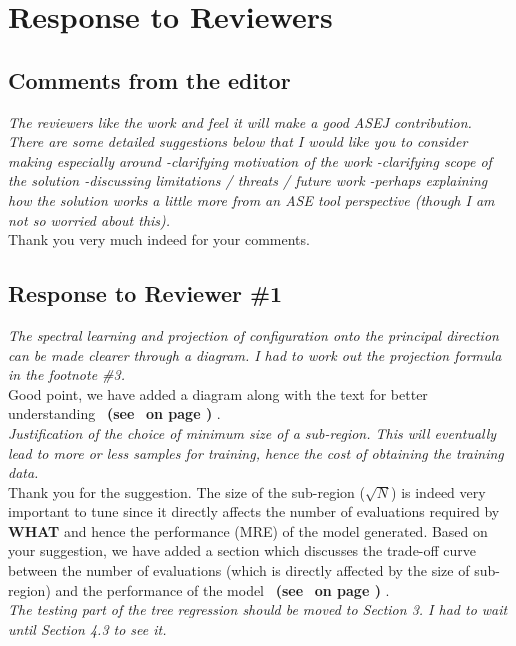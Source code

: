\documentclass[smallextended]{svjour3}       %
\newcommand{\review}[1]{{\textit{#1}}~\\}
\newcommand{\citeresp}[1]{
{\bf (see } \fcolorbox{black}{black!15}{
 \bf
  \scriptsize R-{#1}}~{\bf{on page \pageref{response:#1})}}
}
\newcommand{\what}{{\bf WHAT}\xspace}
\begin{document}
  

\newpage
\section*{Response to Reviewers}
\subsection*{\textbf{Comments from the editor}}

\review{The reviewers like the work and feel it will make a good ASEJ contribution.
There are some detailed suggestions below that I would like you to consider making especially around
-clarifying motivation of the work
-clarifying scope of the solution
-discussing limitations / threats / future work
-perhaps explaining how the solution works a little more from an ASE tool perspective (though I am not so worried about this).}

Thank you very much indeed for your comments.\\

\subsection*{\textbf{Response to Reviewer \#1}}
\noindent
\review{The spectral learning and projection of configuration onto the principal direction can be made clearer through a diagram. I had to work out the projection formula in the footnote \#3.}

\noindent
Good point, we have added a diagram along with the text for better understanding~\citeresp{1a}.\\

\noindent
\review{Justification of the choice of minimum size of a sub-region. This will eventually lead to more or less samples for training, hence the cost of obtaining the training data.}

\noindent
Thank you for the suggestion. The size of the sub-region ($\sqrt{N}$) is indeed very important to tune since it directly affects the number of evaluations required by \what{} and hence the performance (MRE) of the model generated. Based on your suggestion, we have added a section which discusses the trade-off curve between the number of evaluations (which is directly affected by the size of sub-region) and the performance of the model~\citeresp{1b}.\\

\noindent
\review{The testing part of the tree regression should be moved to Section 3. I had to wait until Section 4.3 to see it.}
\end{document}
